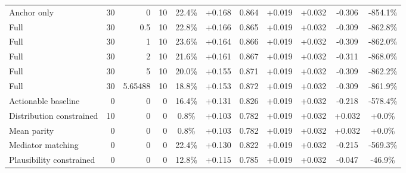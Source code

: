 \begin{table}[htbp]
\begin{tabular}{lrrrccccccc}
Anchor only & 30 & 0 & 10 & 22.4\% & +0.168 & 0.864 & +0.019 & +0.032 & -0.306 & -854.1\% \\
Full & 30 & 0.5 & 10 & 22.8\% & +0.166 & 0.865 & +0.019 & +0.032 & -0.309 & -862.8\% \\
Full & 30 & 1 & 10 & 23.6\% & +0.164 & 0.866 & +0.019 & +0.032 & -0.309 & -862.0\% \\
Full & 30 & 2 & 10 & 21.6\% & +0.161 & 0.867 & +0.019 & +0.032 & -0.311 & -868.0\% \\
Full & 30 & 5 & 10 & 20.0\% & +0.155 & 0.871 & +0.019 & +0.032 & -0.309 & -862.2\% \\
Full & 30 & 5.65488 & 10 & 18.8\% & +0.153 & 0.872 & +0.019 & +0.032 & -0.309 & -861.9\% \\
Actionable baseline & 0 & 0 & 0 & 16.4\% & +0.131 & 0.826 & +0.019 & +0.032 & -0.218 & -578.4\% \\
Distribution constrained & 10 & 0 & 0 & 0.8\% & +0.103 & 0.782 & +0.019 & +0.032 & +0.032 & +0.0\% \\
Mean parity & 0 & 0 & 0 & 0.8\% & +0.103 & 0.782 & +0.019 & +0.032 & +0.032 & +0.0\% \\
Mediator matching & 0 & 0 & 0 & 22.4\% & +0.130 & 0.822 & +0.019 & +0.032 & -0.215 & -569.3\% \\
Plausibility constrained & 0 & 0 & 0 & 12.8\% & +0.115 & 0.785 & +0.019 & +0.032 & -0.047 & -46.9\% \\
\bottomrule
\end{tabular}
\end{table}